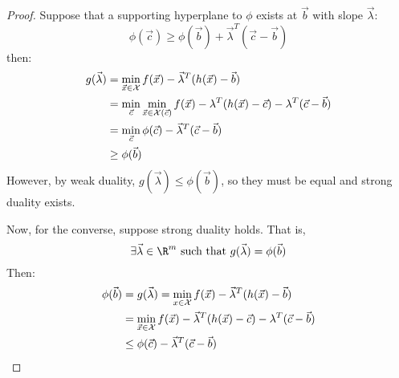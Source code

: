 \documentclass[../Main.tex]{subfiles}
\begin{document}
\begin{proof}
    Suppose that a supporting hyperplane to $\phi$ exists at $\vec{b}$ with slope $\vec{\lambda}$:
    \begin{equation*}
        \phi(\vec{c}) \geq \phi(\vec{b}) + \vec{\lambda}^T (\vec{c} - \vec{b})
    \end{equation*}
    then:
    \begin{align*}
        g(\vec{\lambda}) &= \min_{\vec{x} \in \mathcal{X}} f(\vec{x}) - \vec{\lambda}^T (h(\vec{x}) - \vec{b}) \\
        &= \min_{\vec{c}} \min_{\vec{x} \in \mathcal{X}(\vec{c})} f(\vec{x}) - \lambda^T (h(\vec{x}) - \vec{c}) - \lambda^T (\vec{c} - \vec{b}) \\
        &= \min_{\vec{c}} \phi(\vec{c}) - \vec{\lambda}^T (\vec{c} - \vec{b}) \\
        &\geq \phi(\vec{b})
    \end{align*}
    However, by weak duality, $g(\vec{\lambda}) \leq \phi(\vec{b})$, so they must be equal and strong duality exists.

    Now, for the converse, suppose strong duality holds. That is,
    \begin{equation*}
        \exists \vec{\lambda} \in \R^m \text{ such that } g(\vec{\lambda}) = \phi(\vec{b})
    \end{equation*}
    Then:
    \begin{align*}
        \phi(\vec{b}) &= g(\vec{\lambda}) = \min_{x \in \mathcal{X}} f(\vec{x}) - \vec{\lambda}^T (h(\vec{x}) - \vec{b}) \\
        &= \min_{\vec{x} \in \mathcal{X}} f(\vec{x}) - \vec{\lambda}^T (h(\vec{x}) - \vec{c}) - \lambda^T (\vec{c} - \vec{b}) \\
        &\leq \phi(\vec{c}) - \vec{\lambda}^T (\vec{c} - \vec{b})
    \end{align*}
\end{proof}
\end{document}
